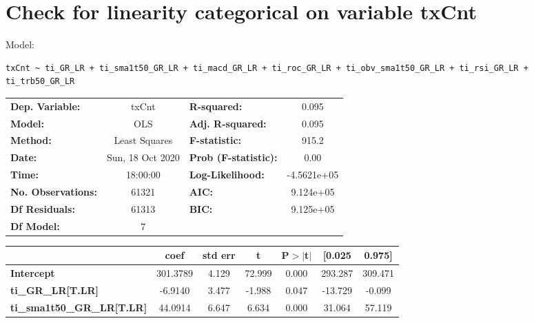 \section{Check for linearity categorical on variable txCnt}

Model: \begin{verbatim}txCnt ~ ti_GR_LR + ti_sma1t50_GR_LR + ti_macd_GR_LR + ti_roc_GR_LR + ti_obv_sma1t50_GR_LR + ti_rsi_GR_LR + ti_trb50_GR_LR\end{verbatim}

\begin{center}
\begin{tabular}{lclc}
\toprule
\textbf{Dep. Variable:}                 &      txCnt       & \textbf{  R-squared:         } &      0.095   \\
\textbf{Model:}                         &       OLS        & \textbf{  Adj. R-squared:    } &      0.095   \\
\textbf{Method:}                        &  Least Squares   & \textbf{  F-statistic:       } &      915.2   \\
\textbf{Date:}                          & Sun, 18 Oct 2020 & \textbf{  Prob (F-statistic):} &      0.00    \\
\textbf{Time:}                          &     18:00:00     & \textbf{  Log-Likelihood:    } & -4.5621e+05  \\
\textbf{No. Observations:}              &       61321      & \textbf{  AIC:               } &  9.124e+05   \\
\textbf{Df Residuals:}                  &       61313      & \textbf{  BIC:               } &  9.125e+05   \\
\textbf{Df Model:}                      &           7      & \textbf{                     } &              \\
\bottomrule
\end{tabular}
\begin{tabular}{lcccccc}
                                        & \textbf{coef} & \textbf{std err} & \textbf{t} & \textbf{P$> |$t$|$} & \textbf{[0.025} & \textbf{0.975]}  \\
\midrule
\textbf{Intercept}                      &     301.3789  &        4.129     &    72.999  &         0.000        &      293.287    &      309.471     \\
\textbf{ti\_GR\_LR[T.LR]}               &      -6.9140  &        3.477     &    -1.988  &         0.047        &      -13.729    &       -0.099     \\
\textbf{ti\_sma1t50\_GR\_LR[T.LR]}      &      44.0914  &        6.647     &     6.634  &         0.000        &       31.064    &       57.119     \\

\end{tabular}
\end{center}
